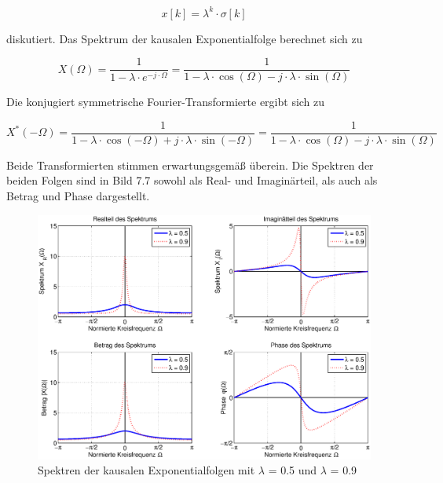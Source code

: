 \begin{equation}\label{eq:sevenfourtynine}
x\left[k\right]=\lambda ^{k} \cdot \sigma \left[k\right]
\end{equation}

\noindent diskutiert. Das Spektrum der kausalen Exponentialfolge berechnet sich zu

\begin{equation}\label{eq:sevenfifty}
X\left(\Omega \right)=\frac{1}{1-\lambda \cdot e^{-j\cdot \Omega } } =\frac{1}{1-\lambda \cdot \cos \left(\Omega \right)-j\cdot \lambda \cdot \sin \left(\Omega \right)}
\end{equation}

\noindent Die konjugiert symmetrische Fourier-Transformierte ergibt sich zu

\begin{equation}\label{eq:sevenfiftyone}
X^{*} \left(-\Omega \right)=\frac{1}{1-\lambda \cdot \cos \left(-\Omega \right)+j\cdot \lambda \cdot \sin \left(-\Omega \right)} =\frac{1}{1-\lambda \cdot \cos \left(\Omega \right)-j\cdot \lambda \cdot \sin \left(\Omega \right)}
\end{equation}

\noindent Beide Transformierten stimmen erwartungsgem\"{a}{\ss} \"{u}berein. Die Spektren der beiden Folgen sind in Bild 7.7 sowohl als Real- und Imagin\"{a}rteil, als auch als Betrag und Phase dargestellt.

\begin{figure}[H]
  \centerline{\includegraphics[width=1\textwidth]{Kapitel7/Bilder/image7.eps}}
  \caption{Spektren der kausalen Exponentialfolgen mit $\lambda$ = 0.5 und $\lambda$ = 0.9}
  \label{fig:EinseitigeExponentialfolgeSymmetrie}
\end{figure}

